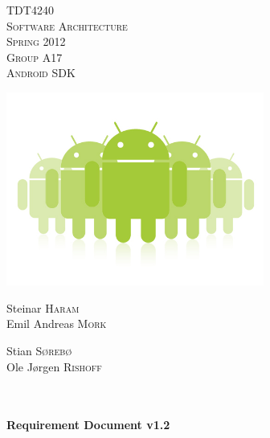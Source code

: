 \begin{titlepage}

\begin{center}

\textsc{\Large TDT4240}\\[1.0cm]

\textsc{\LARGE Software Architecture}\\[1.0cm]

\textsc{\Large Spring 2012}\\[1.0cm]

\textsc{Group A17} \\
\textsc{Android SDK}

\includegraphics[width=240pt]{./androids}\\[0.5cm]   

\begin{minipage}{0.4\textwidth}
\begin{flushleft} \large

Steinar \textsc{Haram}\\
Emil Andreas \textsc{Mork}\\

\end{flushleft}
\end{minipage}
\begin{minipage}{0.4\textwidth}
\begin{flushright} \large

Stian \textsc{Sørebø}\\
Ole Jørgen \textsc{Rishoff}

\end{flushright}
\end{minipage}\\[1.0cm]

\HRule \\[0.4cm]
{ \huge \bfseries Requirement Document v1.2}\\[0.4cm]
\HRule \\[1.5cm]


\end{center}
\end{titlepage}

